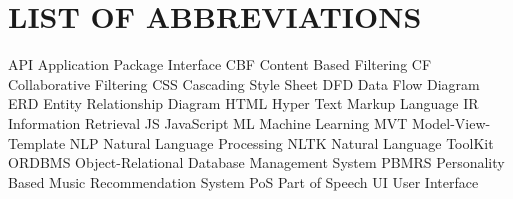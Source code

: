 
\newpage
\section*{LIST OF ABBREVIATIONS}

API		Application Package Interface
CBF		Content Based Filtering
CF		Collaborative Filtering
CSS		Cascading Style Sheet
DFD		Data Flow Diagram
ERD		Entity Relationship Diagram
HTML	Hyper Text Markup Language
IR		Information Retrieval
JS		JavaScript
ML		Machine Learning
MVT		Model-View-Template
NLP		Natural Language Processing
NLTK	Natural Language ToolKit
ORDBMS	Object-Relational Database Management System
PBMRS	Personality Based Music Recommendation System
PoS		Part of Speech
UI		User Interface

